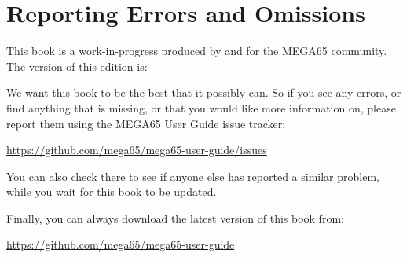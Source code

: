 \chapter*{Reporting Errors and Omissions}

This book is a work-in-progress produced by and for the MEGA65 community.
The version of this edition is:



We want this book to be the best that it possibly can. So if you see any errors,
or find anything that is missing, or that you would like more information on,
please report them using the MEGA65 User Guide issue tracker:

\url{https://github.com/mega65/mega65-user-guide/issues}

You can also check there to see if anyone else has reported a similar problem,
while you wait for this book to be updated.

Finally, you can always download the latest version of this book from:

\url{https://github.com/mega65/mega65-user-guide}


